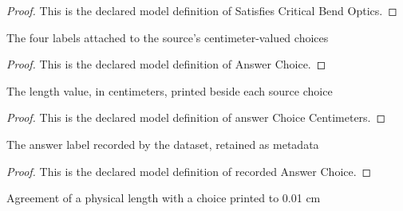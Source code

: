 \begin{proof}
  This is the declared model definition of Satisfies Critical Bend Optics.
\end{proof}
\begin{definition}
  \label{def:physics:phyx-mini-0107:phyxminiproblems-problemphyxmini0107-answerchoice}
  The four labels attached to the source's centimeter-valued choices
\end{definition}
\begin{proof}
  This is the declared model definition of Answer Choice.
\end{proof}
\begin{definition}
  \label{def:physics:phyx-mini-0107:phyxminiproblems-problemphyxmini0107-answerchoicecentimeters}
  The length value, in centimeters, printed beside each source choice
\end{definition}
\begin{proof}
  This is the declared model definition of answer Choice Centimeters.
\end{proof}
\begin{definition}
  \label{def:physics:phyx-mini-0107:phyxminiproblems-problemphyxmini0107-recordedanswerchoice}
  The answer label recorded by the dataset, retained as metadata
\end{definition}
\begin{proof}
  This is the declared model definition of recorded Answer Choice.
\end{proof}
\begin{definition}
  \label{def:physics:phyx-mini-0107:phyxminiproblems-problemphyxmini0107-matchescentimeterchoice}
  Agreement of a physical length with a choice printed to 0.01 cm
\end{definition}
